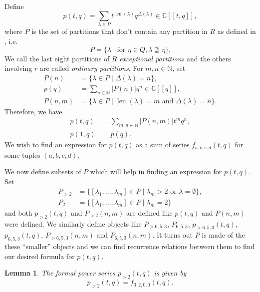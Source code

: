 \documentclass[a4paper, 12pt, reqno]{amsart}
\newtheorem{lemma}[theorem]{Lemma}
\theoremstyle{remark}
\DeclareMathOperator{\len}{len}
\begin{document}
Define
\begin{equation*}
  p(t, q) = \sum_{\lambda \in P}t^{\len(\lambda)}q^{\Delta(\lambda)} \in \mathbb{C}[[t, q]],
\end{equation*}
where $P$ is the set of partitions that don't contain any partition in $R$ as defined in , i.e.
\begin{equation*}
  P = \{\lambda \mid \text{for }\eta \in Q, \lambda \nsupseteq \eta\}.
\end{equation*}
We call the last eight partitions of $R$ \emph{exceptional partitions} and the others involving $r$ are called \emph{ordinary partitions}.
For $m, n \in \mathbb{N}$, set
\begin{align*}
  P(n) &= \{\lambda \in P \mid \Delta(\lambda) = n\}, \\
  p(q) &= \sum_{n \in \mathbb{N}}|P(n)|q^n \in \mathbb{C}[[q]], \\
  P(n, m) &= \{\lambda \in P \mid \len(\lambda) = m\text{ and }\Delta(\lambda) = n\}.
\end{align*}
Therefore, we have
\begin{align*}
  p(t, q) &= \sum_{m, n \in \mathbb{N}}|P(n, m)|t^mq^n, \\
  p(1, q) &= p(q).
\end{align*}
We wish to find an expression for $p(t, q)$ as a sum of series $f_{a, b, c, d}(t, q)$ for some tuples $(a, b, c, d)$.

We now define subsets of $P$ which will help in finding an expression for $p(t, q)$.
Set
\begin{align*}
  P_{>2} &= \{[\lambda_1, \dots, \lambda_m] \in P \mid \lambda_m > 2\text{ or }\lambda = \emptyset\}, \\
  P_2 &= \{[\lambda_1, \dots, \lambda_m] \in P \mid \lambda_m = 2\}
\end{align*}
and both $p_{>2}(t, q)$ and $P_{>2}(n, m)$ are defined like $p(t, q)$ and $P(n, m)$ were defined.
We similarly define objects like $P_{>6, 5, 3}$, $P_{6, 5, 3}$, $p_{>6, 5, 3}(t, q)$, $p_{6, 5, 3}(t, q)$, $P_{>6, 5, 3}(n, m)$ and $P_{6, 5, 3}(n, m)$.
It turns out $P$ is made of the these ``smaller'' objects and we can find recurrence relations between them to find our desired formula for $p(t, q)$.

\begin{lemma}
  \label{lmm:2}
  The formal power series $p_{>2}(t, q)$ is given by
  \begin{equation*}
    p_{>2}(t, q) = f_{3, 2, 0, 0}(t, q).
  \end{equation*}
\end{lemma}
\end{document}

